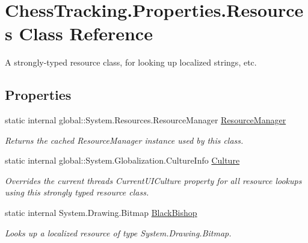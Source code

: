 \hypertarget{class_chess_tracking_1_1_properties_1_1_resources}{}\section{Chess\+Tracking.\+Properties.\+Resources Class Reference}
\label{class_chess_tracking_1_1_properties_1_1_resources}


A strongly-\/typed resource class, for looking up localized strings, etc.  


\subsection*{Properties}
\begin{DoxyCompactItemize}
\item 
static internal global\+::\+System.\+Resources.\+Resource\+Manager \mbox{\hyperlink{class_chess_tracking_1_1_properties_1_1_resources_ab404fea48cfbfeaced8490e58fa953e8}{Resource\+Manager}}
\begin{DoxyCompactList}\small\item\em Returns the cached Resource\+Manager instance used by this class. \end{DoxyCompactList}\item 
static internal global\+::\+System.\+Globalization.\+Culture\+Info \mbox{\hyperlink{class_chess_tracking_1_1_properties_1_1_resources_a80e6d45221b54dbc81987827118306e5}{Culture}}
\begin{DoxyCompactList}\small\item\em Overrides the current thread\textquotesingle{}s Current\+U\+I\+Culture property for all resource lookups using this strongly typed resource class. \end{DoxyCompactList}\item 
static internal System.\+Drawing.\+Bitmap \mbox{\hyperlink{class_chess_tracking_1_1_properties_1_1_resources_a7e82e89469298b5551960365a6a7554e}{Black\+Bishop}}
\begin{DoxyCompactList}\small\item\em Looks up a localized resource of type System.\+Drawing.\+Bitmap. \end{DoxyCompactList}\item 

\end{DoxyCompactItemize}

